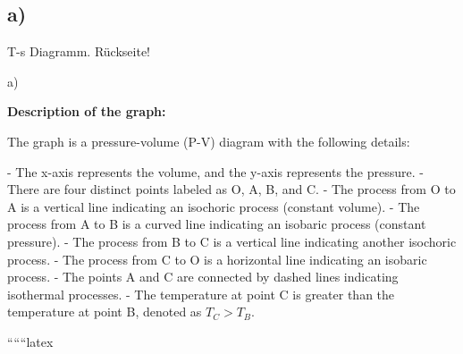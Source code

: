 

\subsection*{a)}
T-s Diagramm. Rückseite!

a)

\textbf{Description of the graph:}

The graph is a pressure-volume (P-V) diagram with the following details:

- The x-axis represents the volume, and the y-axis represents the pressure.
- There are four distinct points labeled as O, A, B, and C.
- The process from O to A is a vertical line indicating an isochoric process (constant volume).
- The process from A to B is a curved line indicating an isobaric process (constant pressure).
- The process from B to C is a vertical line indicating another isochoric process.
- The process from C to O is a horizontal line indicating an isobaric process.
- The points A and C are connected by dashed lines indicating isothermal processes.
- The temperature at point C is greater than the temperature at point B, denoted as \( T_C > T_B \).

``````latex